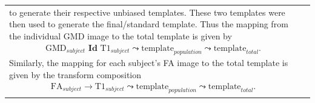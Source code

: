 \documentclass[paperwidth=48in,paperheight=48in,portrait,final]{baposter}
\begin{document}
\begin{poster}
{\begin{center}
\begin{tabular}{p{11cm}p{11cm}}
to generate their respective unbiased templates.  These two templates were then
used to generate the final/standard template.  Thus the mapping from the individual 
GMD image to the total template is given by
\begin{align*}
  \mathrm{GMD}_{subject}\,\,\mathbf{Id}\,\, \mathrm{T1}_{subject}\leadsto \mathrm{template}_{population}\leadsto \mathrm{template}_{total}.
\end{align*}
Similarly, the mapping for each subject's FA image to the total template is given
by the 
transform composition
\begin{align*}
  \mathrm{FA}_{subject}\rightarrow\mathrm{T1}_{subject}\leadsto \mathrm{template}_{population}\leadsto \mathrm{template}_{total}.
\end{align*}
\\
\end{tabular}
\end{center}

\vspace{-10mm}
  }

\end{poster}
\end{document}
